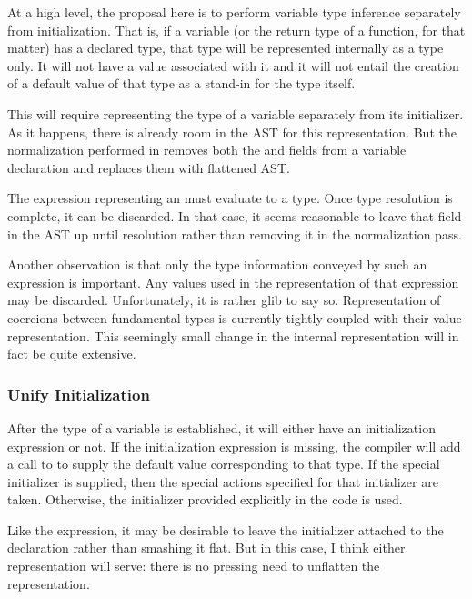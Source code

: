 At a high level, the proposal here is to perform variable type inference separately from
initialization.  That is, if a variable (or the return type of a function, for that
matter) has a declared type, that type will be represented internally as a type only.  It
will not have a value associated with it and it will not entail the creation of a default
value of that type as a stand-in for the type itself.

This will require representing the type of a variable separately from its
initializer.  As it happens, there is already room in the AST for this representation.
But the normalization performed in  removes both the 
and  fields from a variable declaration and replaces them with flattened AST.

The expression representing an  must evaluate to a type.  Once type
resolution is complete, it can be discarded.  In that case, it seems reasonable to leave
that field in the AST up until resolution rather than removing it in the normalization
pass.

Another observation is that only the type information conveyed by such an expression is
important.  Any values used in the representation of that expression may be discarded.
Unfortunately, it is rather glib to say so.  Representation of coercions between
fundamental types is currently tightly coupled with their value representation.  This
seemingly small change in the internal representation will in fact be quite extensive.

\subsubsection{Unify Initialization}

After the type of a variable is established, it will either have an initialization
expression or not.  If the initialization expression is missing, the compiler will add a
call to  to supply the default value corresponding to that type.  If the
special  initializer is supplied, then the special actions specified for
that initializer are taken.  Otherwise, the initializer provided explicitly in the code is
used.

Like the  expression, it may be desirable to leave the initializer attached
to the declaration rather than smashing it flat.  But in this case, I think either
representation will serve: there is no pressing need to unflatten the representation.

